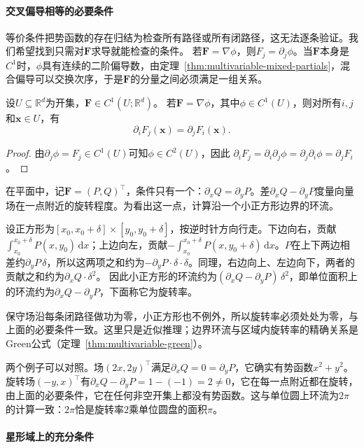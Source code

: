 \paragraph{交叉偏导相等的必要条件}

等价条件把势函数的存在归结为检查所有路径或所有闭路径，这无法逐条验证。我们希望找到只需对$\bm F$求导就能检查的条件。
若$\bm F=\nabla\phi$，则$F_j=\partial_j\phi$。当$\bm F$本身是$C^1$时，$\phi$具有连续的二阶偏导数，由定理~\ref{thm:multivariable-mixed-partials}，混合偏导可以交换次序，于是$\bm F$的分量之间必须满足一组关系。
\begin{theorem}[保守场的必要条件]
设$U\subseteq\mathbb R^d$为开集，$\bm F\in C^1(U;\mathbb R^d)$。
若$\bm F=\nabla\phi$，其中$\phi\in C^1(U)$，则对所有$i,j$和$\bm x\in U$，有
\[
 \partial_iF_j(\bm x)=\partial_jF_i(\bm x).
\]
\end{theorem}
\begin{proof}
由$\partial_j\phi=F_j\in C^1(U)$可知$\phi\in C^2(U)$，因此
$\partial_iF_j=\partial_i\partial_j\phi=\partial_j\partial_i\phi=\partial_jF_i$。
\end{proof}

在平面中，记$\bm F=(P,Q)^\top$，条件只有一个：$\partial_xQ=\partial_yP$。差$\partial_xQ-\partial_yP$度量向量场在一点附近的旋转程度。为看出这一点，计算沿一个小正方形边界的环流。

设正方形为$[x_0,x_0+\delta]\times[y_0,y_0+\delta]$，按逆时针方向行走。下边向右，贡献$\int_{x_0}^{x_0+\delta}P(x,y_0)\,\mathrm dx$；上边向左，贡献$-\int_{x_0}^{x_0+\delta}P(x,y_0+\delta)\,\mathrm dx$。$P$在上下两边相差约$\partial_yP\,\delta$，所以这两项之和约为$-\partial_yP\cdot\delta\cdot\delta$。同理，右边向上、左边向下，两者的贡献之和约为$\partial_xQ\cdot\delta^2$。
因此小正方形的环流约为$(\partial_xQ-\partial_yP)\,\delta^2$，即单位面积上的环流约为$\partial_xQ-\partial_yP$，下面称它为旋转率。

保守场沿每条闭路径做功为零，小正方形也不例外，所以旋转率必须处处为零，与上面的必要条件一致。这里只是近似推理；边界环流与区域内旋转率的精确关系是Green公式（定理~\ref{thm:multivariable-green}）。

两个例子可以对照。场$(2x,2y)^\top$满足$\partial_xQ=0=\partial_yP$，它确实有势函数$x^2+y^2$。旋转场$(-y,x)^\top$有$\partial_xQ-\partial_yP=1-(-1)=2\neq0$，它在每一点附近都在旋转，由上面的必要条件，它在任何非空开集上都没有势函数。这与单位圆上环流为$2\pi$的计算一致：$2\pi$恰是旋转率$2$乘单位圆盘的面积$\pi$。

\paragraph{星形域上的充分条件}

